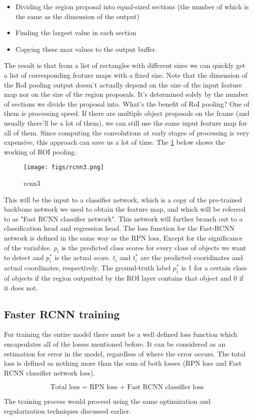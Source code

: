 \begin{itemize}
	\item Dividing the region proposal into equal-sized sections (the number of which is the same as the dimension of the output)
	\item Finding the largest value in each section
	\item Copying these max values to the output buffer.
\end{itemize}

The result is that from a list of rectangles with different sizes we can quickly get a list of corresponding feature maps with a fixed size. Note that the dimension of the RoI pooling output doesn’t actually depend on the size of the input feature map nor on the size of the region proposals. It’s determined solely by the number of sections we divide the proposal into. What’s the benefit of RoI pooling? One of them is processing speed. If there are multiple object proposals on the frame (and usually there’ll be a lot of them), we can still use the same input feature map for all of them. Since computing the convolutions at early stages of processing is very expensive, this approach can save us a lot of time. The \cref{fig:rcnn3} below shows the working of ROI pooling.

\begin{figure}[!htpb]
	\centering
	\texttt{[image: figs/rcnn3.png]}
	\caption{rcnn3}\label{fig:rcnn3}
\end{figure}

This will be the input to a classifier network, which is a copy of the pre-trained backbone network we used to obtain the feature map, and which will be referred to as "Fast RCNN classifier network". This network will further branch out to a classification head and regression head. The loss function for the Fast-RCNN network is defined in the same way as the RPN loss, Except for the significance of the variables. $p_{i}$ is the predicted class scores for every class of objects we want to detect and $p_{i}^*$ is the actual score. $t_{i}$ and $t_{i}^*$ are the predicted cooridinates and actual coordinates, respectively. The ground-truth label $p_{i}^*$ is 1 for a certain class of objects if the region outputted by the ROI layer contains that object and 0 if it does not.

\subsection{Faster RCNN training}

For training the entire model there must be a well defined loss function which encapsulates all of the losses mentioned before. It can be considered as an estimation for error in the model, regardless of where the error occurs. The total loss is defined as nothing more than the sum of both losses (RPN loss and Fast RCNN classifier network loss).

\begin{equation}
  \text{Total loss = RPN loss + Fast RCNN classifier loss}
\end{equation}

The training process would proceed using the same optimization and regularization techniques discussed earlier.
